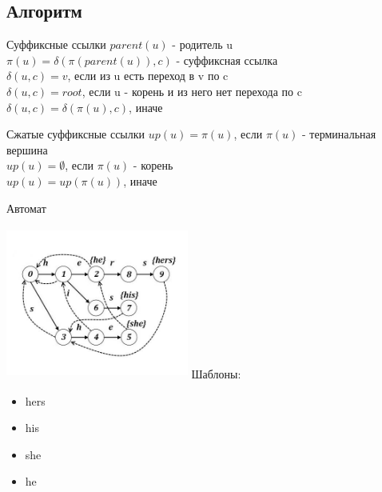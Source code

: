 \documentclass[10pt]{beamer}
\begin{document}
\subsection{Алгоритм}
\begin{frame}[fragile]{Суффиксные ссылки}
$parent(u)$ - родитель u \\
$\pi(u) = \delta(\pi(parent(u)),c)$ - суффиксная ссылка\\
$\delta(u,c) = v$, если из u есть переход в v по c\\
$\delta(u,c) = root$, если u - корень и из него нет перехода по c\\
$\delta(u,c) = \delta(\pi(u), c)$, иначе\\
\end{frame}

\begin{frame}[fragile]{Сжатые суффиксные ссылки}
$up(u) = \pi(u)$, если $\pi(u)$ - терминальная вершина\\
$up(u) = \emptyset$, если $\pi(u)$ - корень\\
$up(u) = up(\pi(u))$, иначе\\
\end{frame}

\begin{frame}[fragile]{Автомат}
\begin{multicols}{2}
\includegraphics[width=6cm, height=5cm]{Term_3/Source/Pictures/aho.jpg}
\vfill\eject
Шаблоны:
\begin{itemize}
    \item hers\\
    \item his\\
    \item she\\
    \item he\\
\end{itemize}

\end{multicols}
\end{frame}
\end{document}
